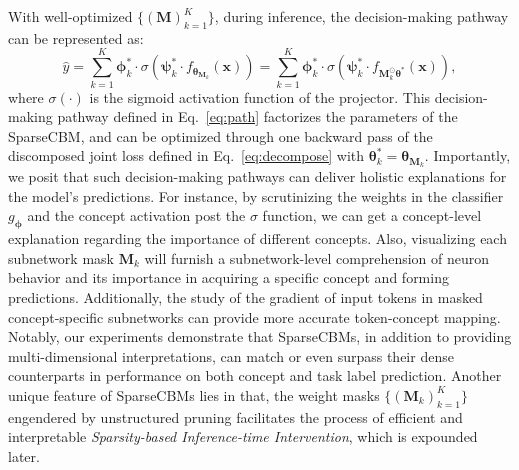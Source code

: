 \documentclass[letterpaper]{article} %
\begin{document}
With well-optimized $\{(\bm{M})_{k=1}^K\}$, during inference, the decision-making pathway can be represented as:
\begin{equation}\label{eq:path}
    \hat{y} = \sum_{k=1}^{K} \bm{\phi}_k^\ast \cdot \sigma(\bm{\psi}_k^\ast \cdot f_{\bm{\theta}_{\bm{M}_k}} (\bm{x})) = \sum_{k=1}^{K} \bm{\phi}_k^\ast \cdot \sigma(\bm{\psi}_k^\ast \cdot f_{\bm{M}_k^ \odot \bm{\theta}^\ast} (\bm{x})),
\end{equation}
where $\sigma(\cdot)$ is the sigmoid activation function of the projector. This decision-making pathway defined in Eq.~\eqref{eq:path} factorizes the parameters of the SparseCBM, and can be optimized through one backward pass of the discomposed joint loss defined in Eq.~\eqref{eq:decompose} with $\bm{\theta}_k^\ast = \bm{\theta}_{\bm{M}_k}$. Importantly, we posit that such decision-making pathways can deliver holistic explanations for the model's predictions. For instance, by scrutinizing the weights in the classifier $g_{\bm{\phi}}$ and the concept activation post the $\sigma$ function, we can get a concept-level explanation regarding the importance of different concepts. Also, visualizing each subnetwork mask $\bm{M}_k$ will furnish a subnetwork-level comprehension of neuron behavior and its importance in acquiring a specific concept and forming predictions. Additionally, the study of the gradient of input tokens in masked concept-specific subnetworks can provide more accurate token-concept mapping. Notably, our experiments demonstrate that SparseCBMs, in addition to providing multi-dimensional interpretations, can match or even surpass their dense counterparts in performance on both concept and task label prediction.
Another unique feature of SparseCBMs lies in that, the weight masks $\{(\bm{M}_k)_{k=1}^K\}$ engendered by unstructured pruning facilitates the process of efficient and interpretable \textit{Sparsity-based Inference-time Intervention}, which is expounded later.
\end{document}
